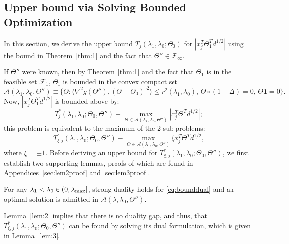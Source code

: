 \subsection{Upper bound via Solving Bounded Optimization}

In this section, we derive the upper bound $T_j(\lambda_1,\lambda_0;\Theta_{0})$ for $|x_j^T\Theta^T_{1}d^{1/2}|$ using the bound in Theorem~\ref{thm:1} and the fact that $\Theta''\in\mathcal{F}_{\infty}$.

If $\Theta''$ were known, then by Theorem~\ref{thm:1} and the fact that $\Theta_{1}$ is in the feasible set $\mathcal{F}_{1}$, $\Theta_{1}$ is bounded in the convex compact set
 \begin{equation}
     \mathcal{A}(\lambda_1,{\lambda_0},\Theta'')\equiv\{\Theta:\langle\nabla^2 g(\Theta''),(\Theta-\Theta_{0})^{\circ 2}\rangle\leq r^2(\lambda_1,\lambda_0),\,\Theta\circ(1-\Delta)=0,\, \Theta\mathbf{1}=0\}.
 \end{equation}
Now, $|x_j^T\Theta^T_{1}d^{1/2}|$ is bounded above by:
\begin{equation}
    T^*_{j}(\lambda_1,\lambda_0;\Theta_{0},\Theta'')\equiv\max_{\Theta\in\mathcal{A}(\lambda_1,{\lambda_0},\Theta'')} |x_j^T\Theta^T d^{1/2}|;
\end{equation}
this problem is equivalent to the maximum of the 2 sub-problems:
\begin{equation}
    \label{eq:bounddual}
    T^*_{\xi,j}(\lambda_1,\lambda_0;\Theta_{0},\Theta'')\equiv\max_{\Theta\in\mathcal{A}(\lambda_1,\lambda_0,\Theta'')} \xi x_j^T\Theta^T d^{1/2},
\end{equation}
where $\xi = \pm 1$. Before deriving an upper bound for $T^*_{\xi,j}(\lambda_1,\lambda_0;\Theta_{0},\Theta'')$, we first establish two supporting lemmas, proofs of which are found in Appendices~\ref{sec:lem2proof} and \ref{sec:lem3proof}.

\begin{lemma}
    \label{lem:2}
    For any $\lambda_1<\lambda_{0}\in (0,\lambda_\textnormal{max}]$, strong duality holds for \eqref{eq:bounddual} and an optimal solution is admitted in $\mathcal{A}(\lambda,{\lambda_0},\Theta'')$.
\end{lemma}

Lemma~\ref{lem:2} implies that there is no duality gap, and thus, that $T^*_{\xi,j}(\lambda_1,\lambda_0;\Theta_{0},\Theta'')$ can be found by solving its dual formulation, which is given in Lemma~\ref{lem:3}. 

